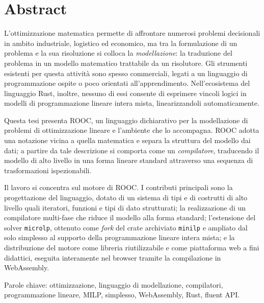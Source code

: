 \thispagestyle{plain}			%
\setlength{\parskip}{0pt plus 1.0pt}
\section*{Abstract}
L'ottimizzazione matematica permette di affrontare numerosi problemi decisionali
in ambito industriale, logistico ed economico, ma tra la formulazione di un
problema e la sua risoluzione si colloca la \emph{modellazione}: la traduzione del
problema in un modello matematico trattabile da un risolutore. Gli strumenti
esistenti per questa attività sono spesso commerciali, legati a un linguaggio di
programmazione ospite o poco orientati all'apprendimento. Nell'ecosistema del
linguaggio Rust, inoltre, nessuno di essi consente di esprimere vincoli logici 
in modelli di programmazione lineare intera mista, linearizzandoli
automaticamente.

Questa tesi presenta ROOC, un linguaggio dichiarativo per la modellazione di
problemi di ottimizzazione lineare e l'ambiente che lo accompagna. ROOC adotta una
notazione vicina a quella matematica e separa la struttura del modello dai dati; a
partire da tale descrizione si comporta come un \emph{compilatore}, traducendo il
modello di alto livello in una forma lineare standard attraverso una sequenza di
trasformazioni ispezionabili.

Il lavoro si concentra sul motore di ROOC. I contributi principali sono la
progettazione del linguaggio, dotato di un sistema di tipi e di costrutti di alto
livello quali iteratori, funzioni e tipi di dato strutturati; la
realizzazione di un compilatore multi-fase che riduce il modello alla forma
standard; l'estensione del solver \texttt{microlp}, ottenuto come \emph{fork} del
crate archiviato \texttt{minilp} e ampliato dal solo simplesso al supporto della
programmazione lineare intera mista; e la distribuzione del motore come libreria
riutilizzabile e come piattaforma web a fini didattici, eseguita interamente nel
browser tramite la compilazione in WebAssembly.

\vfill
Parole chiave: ottimizzazione, linguaggio di modellazione, compilatori, programmazione lineare, MILP, simplesso, WebAssembly, Rust, fluent API.

\thispagestyle{empty}
\mbox{}
